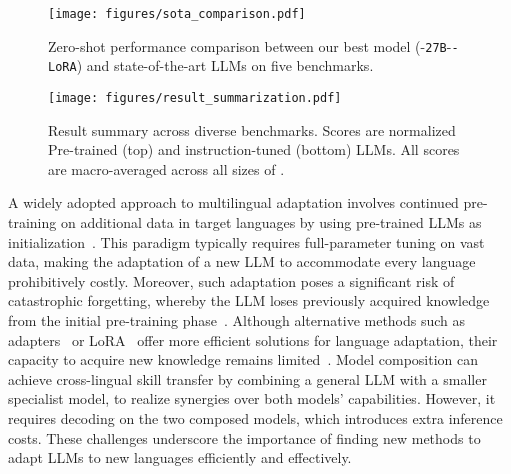 \begin{figure}[t]
    \centering
    \texttt{[image: figures/sota\_comparison.pdf]}
    \vspace{-9mm}
    \caption{Zero-shot performance comparison between our best model (\gemmatwo-\texttt{27B}-\texttt{\ouradapter-LoRA}) and state-of-the-art LLMs on five benchmarks.}
    \vspace{-4mm}
    \label{fig:sota_comparison}
\end{figure}
\begin{figure}[t]
    \centering
    \texttt{[image: figures/result\_summarization.pdf]}
    \vspace{-5mm}
    \caption{Result summary across diverse benchmarks. Scores are normalized \versus Pre-trained (top) and instruction-tuned (bottom) LLMs. All scores are macro-averaged across all sizes of \gemmatwo.}
    \vspace{-6mm}
    \label{fig:result_summarization}
\end{figure}

A widely adopted approach to multilingual adaptation involves continued pre-training on additional data in target languages by using pre-trained LLMs as initialization~\citep{fujii2024continual, zheng-etal-2024-breaking}. This paradigm typically requires full-parameter tuning on vast data, making the adaptation of a new LLM to accommodate every language prohibitively costly. Moreover, such adaptation poses a significant risk of catastrophic forgetting, whereby the LLM loses previously acquired knowledge from the initial pre-training phase~\citep{luo2024empiricalstudycatastrophicforgetting, shi2024continuallearninglargelanguage}. Although alternative methods such as adapters~\citep{pfeiffer-etal-2021-unks} or LoRA~\citep{hu2022lora} offer more efficient solutions for language adaptation, their capacity to acquire new knowledge remains limited~\citep{biderman2024lora}. 
Model composition \citep{bansal2024llm} can achieve cross-lingual skill transfer by combining a general LLM with a smaller specialist model, to realize synergies over both models' capabilities. However, it requires decoding on the two composed models, which introduces extra inference costs.
These challenges underscore the importance of finding new methods to adapt LLMs to new languages efficiently and effectively.



